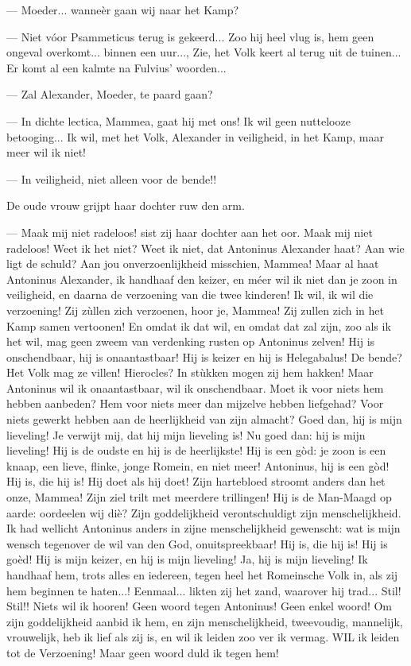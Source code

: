 \documentclass[a4paper, 12pt, oneside, dutch]{article}
\begin{document}
--- Moeder... wanneèr gaan wij naar het Kamp?

--- Niet vóor Psammeticus terug is gekeerd... Zoo hij heel vlug is, hem geen ongeval overkomt... binnen een uur..., Zie, het Volk keert al terug uit de tuinen... Er komt al een kalmte na Fulvius' woorden...

--- Zal Alexander, Moeder, te paard gaan?

--- In dichte lectica, Mammea, gaat hij met ons! Ik wil geen nuttelooze betooging... Ik wil, met het Volk, Alexander in veiligheid, in het Kamp, maar meer wil ik niet!

--- In veiligheid, niet alleen voor de bende!!

De oude vrouw grijpt haar dochter ruw den arm.

--- Maak mij niet radeloos! sist zij haar dochter aan het oor. Maak mij niet radeloos! Weet ik het niet? Weet ik niet, dat Antoninus Alexander haat? Aan wie ligt de schuld? Aan jou onverzoenlijkheid misschien, Mammea! Maar al haat Antoninus Alexander, ik handhaaf den keizer, en méer wil ik niet dan je zoon in veiligheid, en daarna de verzoening van die twee kinderen! Ik wil, ik wil die verzoening! Zij zùllen zich verzoenen, hoor je, Mammea! Zij zullen zich in het Kamp samen vertoonen! En omdat ik dat wil, en omdat dat zal zijn, zoo als ik het wil, mag geen zweem van verdenking rusten op Antoninus zelven! Hij is onschendbaar, hij is onaantastbaar! Hij is keizer en hij is Helegabalus! De bende? Het Volk mag ze villen! Hierocles? In stùkken mogen zij hem hakken! Maar Antoninus wil ik onaantastbaar, wil ik onschendbaar. Moet ik voor niets hem hebben aanbeden? Hem voor niets meer dan mijzelve hebben liefgehad? Voor niets gewerkt hebben aan de heerlijkheid van zijn almacht? Goed dan, hij is mijn lieveling! Je verwijt mij, dat hij mijn lieveling is! Nu goed dan: hij is mijn lieveling! Hij is de oudste en hij is de heerlijkste! Hij is een gòd: je zoon is een knaap, een lieve, flinke, jonge Romein, en niet meer! Antoninus, hij is een gòd! Hij is, die hij is! Hij doet als hij doet! Zijn hartebloed stroomt anders dan het onze, Mammea! Zijn ziel trilt met meerdere trillingen! Hij is de Man-Maagd op aarde: oordeelen wij diè? Zijn goddelijkheid verontschuldigt zijn menschelijkheid. Ik had wellicht Antoninus anders in zijne menschelijkheid gewenscht: wat is mijn wensch tegenover de wil van den God, onuitspreekbaar! Hij is, die hij is! Hij is goèd! Hij is mijn keizer, en hij is mijn lieveling! Ja, hij is mijn lieveling! Ik handhaaf hem, trots alles en iedereen, tegen heel het Romeinsche Volk in, als zij hem beginnen te haten...! Eenmaal... likten zij het zand, waarover hij trad... Stil! Stil!! Niets wil ik hooren! Geen woord tegen Antoninus! Geen enkel woord! Om zijn goddelijkheid aanbid ik hem, en zijn menschelijkheid, tweevoudig, mannelijk, vrouwelijk, heb ik lief als zij is, en wil ik leiden zoo ver ik vermag. WIL ik leiden tot de Verzoening! Maar geen woord duld ik tegen hem!
\end{document}
